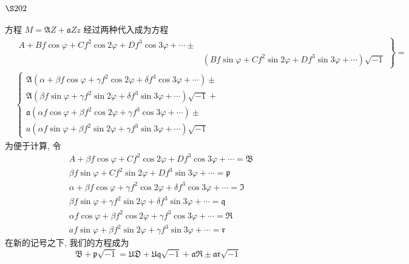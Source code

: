 \section{$\S 202$}

方程 $M=\mathfrak{A} Z+\mathfrak{a} Z z$ 经过两种代入成为方程
\[
\begin{aligned}
& \left.\begin{array}{rl}A+B f \cos \varphi+C f^{2} \cos 2 \varphi+D f^{3} \cos 3 \varphi+\cdots \pm \\& \left(B f \sin \varphi+C f^{2} \sin 2 \varphi+D f^{3} \sin 3 \varphi+\cdots\right) \sqrt{-1}\end{array}\right\}= \\
& \left\{\begin{array}{l}\mathfrak{A}\left(\alpha+\beta f \cos \varphi+\gamma f^{2} \cos 2 \varphi+\delta f^{3} \cos 3 \varphi+\cdots\right) \pm \\\mathfrak{A}\left(\beta f \sin \varphi+\gamma f^{2} \sin 2 \varphi+\delta f^{3} \sin 3 \varphi+\cdots\right) \sqrt{-1}+ \\\mathfrak{a}\left(\alpha f \cos \varphi+\beta f^{2} \cos 2 \varphi+\gamma f^{3} \cos 3 \varphi+\cdots\right) \pm \\a\left(\alpha f \sin \varphi+\beta f^{2} \sin 2 \varphi+\gamma f^{3} \sin 3 \varphi+\cdots\right) \sqrt{-1}\end{array}\right.
\end{aligned}
\]
为便于计算, 令
\[
\begin{aligned}
& A+ \beta f \cos \varphi+C f^{2} \cos 2 \varphi+D f^{3} \cos 3 \varphi+\cdots=\mathfrak{B} \\
& \beta f \sin \varphi+C f^{2} \sin 2 \varphi+D f^{3} \sin 3 \varphi+\cdots=\mathfrak{p} \\
& \alpha+\beta f \cos \varphi+\gamma f^{2} \cos 2 \varphi+\delta f^{3} \cos 3 \varphi+\cdots=\Im \\
& \beta f \sin \varphi+\gamma f^{2} \sin 2 \varphi+\delta f^{3} \sin 3 \varphi+\cdots=\mathfrak{q} \\
& \alpha f \cos \varphi+\beta f^{2} \cos 2 \varphi+\gamma f^{3} \cos 3 \varphi+\cdots=\mathfrak{R} \\
& a f \sin \varphi+\beta f^{2} \sin 2 \varphi+\gamma f^{3} \sin 3 \varphi+\cdots=\mathfrak{r}
\end{aligned}
\]
在新的记号之下, 我们的方程成为
\[
\mathfrak{B}+\mathfrak{p} \sqrt{-1}=\mathfrak{U} \mathfrak{D}+\mathfrak{U} \mathfrak{q} \sqrt{-1}+\mathfrak{a} \mathfrak{R} \pm \mathfrak{a r} \sqrt{-1}
\]


